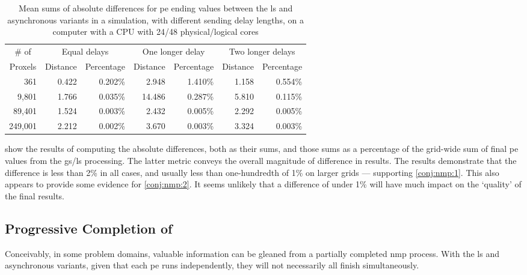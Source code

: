 \begin{table}
\centering
\begin{tabular}{@{}r|rr|rr|rr@{}}
\toprule
\multicolumn{1}{c|}{\# of}   & \multicolumn{2}{c|}{Equal delays} & \multicolumn{2}{c|}{One longer delay} & \multicolumn{2}{c}{Two longer delays} \\ \cmidrule(l){2-7} 
\multicolumn{1}{c|}{Proxels} & Distance     & Percentage     & Distance      & Percentage      & Distance      & Percentage      \\ \midrule
361  & 0.422 & 0.202\% & 2.948 & 1.410\% & 1.158 & 0.554\% \\
9,801  & 1.766 & 0.035\% & 14.486 & 0.287\% & 5.810 & 0.115\% \\
89,401  & 1.524 & 0.003\% & 2.432 & 0.005\% & 2.292 & 0.005\% \\
249,001  & 2.212 & 0.002\% & 3.670 & 0.003\% & 3.324 & 0.003\% \\ \bottomrule
\end{tabular}%
\caption[Mean sums of absolute differences for  ending values between the \gls{ls} and asynchronous variants on a 48-core CPU]{Mean sums of absolute differences for \gls{pe} ending values between the \gls{ls} and asynchronous variants in a simulation, with different sending delay lengths, on a computer with a CPU with 24/48 physical/logical cores}
\label{tab:nmp:diffs48cores}
\end{table}

 show the results of computing the absolute differences, both as their sums, and those sums as a percentage of the grid-wide sum of final \gls{pe} values from the \gls{gs}/\gls{ls} processing.  The latter metric conveys the overall magnitude of difference in results.  The results demonstrate that the difference is less than 2\% in all cases, and usually less than one-hundredth of 1\% on larger grids --- supporting \cref{conj:nmp:1}.  This also appears to provide some evidence for \cref{conj:nmp:2}.  It seems unlikely that a difference of under 1\% will have much impact on the `quality' of the final results.

\subsection{Progressive Completion of }
Conceivably, in some problem domains, valuable information can be gleaned from a partially completed \gls{nmp} process.  With the \gls{ls} and asynchronous variants, given that each \gls{pe} runs independently, they will not necessarily all finish simultaneously.

